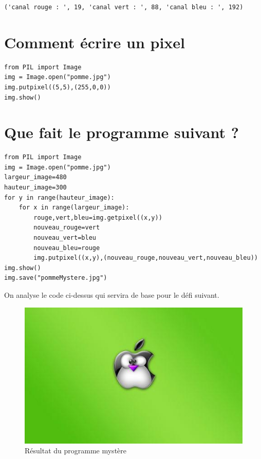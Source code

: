 \documentclass[11pt]{article}
\begin{document}
\begin{verbatim}
('canal rouge : ', 19, 'canal vert : ', 88, 'canal bleu : ', 192)
\end{verbatim}


\section{Comment écrire un pixel}
\label{sec:org006845f}

\begin{verbatim}
from PIL import Image
img = Image.open("pomme.jpg")
img.putpixel((5,5),(255,0,0))
img.show()
\end{verbatim}


\section{Que fait le programme suivant ?}
\label{sec:org06eb80c}

\begin{verbatim}
from PIL import Image
img = Image.open("pomme.jpg")
largeur_image=480
hauteur_image=300
for y in range(hauteur_image):
    for x in range(largeur_image):
        rouge,vert,bleu=img.getpixel((x,y))
        nouveau_rouge=vert
        nouveau_vert=bleu
        nouveau_bleu=rouge
        img.putpixel((x,y),(nouveau_rouge,nouveau_vert,nouveau_bleu))
img.show()
img.save("pommeMystere.jpg")
\end{verbatim}


On analyse le code ci-dessus qui servira de base pour le défi suivant.

\begin{figure}[htbp]
\centering
\includegraphics[width=.9\linewidth]{pommeMystere.jpg}
\caption{Résultat du programme mystère}
\end{figure}
\end{document}
